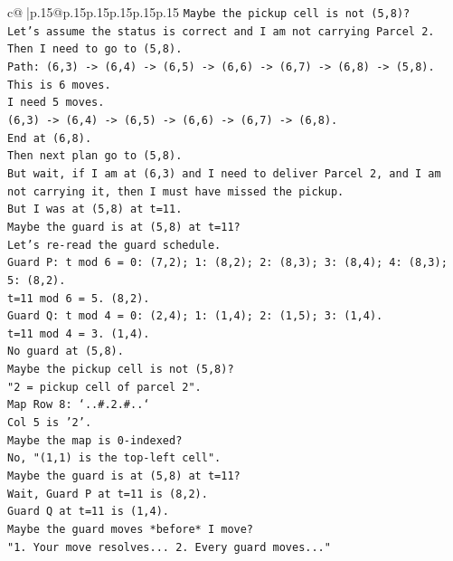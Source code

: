 \documentclass{article}
\begin{document}
{\begin{supertabular}{c@{$\;$}|p{.15\linewidth}@{}p{.15\linewidth}p{.15\linewidth}p{.15\linewidth}p{.15\linewidth}p{.15\linewidth}}
{{{\texttt{Maybe the pickup cell is not (5,8)?} \\
\texttt{Let's assume the status is correct and I am not carrying Parcel 2.} \\
\texttt{Then I need to go to (5,8).} \\
\texttt{Path: (6,3) {-}> (6,4) {-}> (6,5) {-}> (6,6) {-}> (6,7) {-}> (6,8) {-}> (5,8).} \\
\texttt{This is 6 moves.} \\
\texttt{I need 5 moves.} \\
\texttt{(6,3) {-}> (6,4) {-}> (6,5) {-}> (6,6) {-}> (6,7) {-}> (6,8).} \\
\texttt{End at (6,8).} \\
\texttt{Then next plan go to (5,8).} \\
\texttt{But wait, if I am at (6,3) and I need to deliver Parcel 2, and I am not carrying it, then I must have missed the pickup.} \\
\texttt{But I was at (5,8) at t=11.} \\
\texttt{Maybe the guard is at (5,8) at t=11?} \\
\texttt{Let's re{-}read the guard schedule.} \\
\texttt{Guard P: t mod 6 = 0: (7,2); 1: (8,2); 2: (8,3); 3: (8,4); 4: (8,3); 5: (8,2).} \\
\texttt{t=11 mod 6 = 5. (8,2).} \\
\texttt{Guard Q: t mod 4 = 0: (2,4); 1: (1,4); 2: (1,5); 3: (1,4).} \\
\texttt{t=11 mod 4 = 3. (1,4).} \\
\texttt{No guard at (5,8).} \\
\texttt{Maybe the pickup cell is not (5,8)?} \\
\texttt{"2 = pickup cell of parcel 2".} \\
\texttt{Map Row 8: `..\#.2.\#..`} \\
\texttt{Col 5 is '2'.} \\
\texttt{Maybe the map is 0{-}indexed?} \\
\texttt{No, "(1,1) is the top{-}left cell".} \\
\texttt{Maybe the guard is at (5,8) at t=11?} \\
\texttt{Wait, Guard P at t=11 is (8,2).} \\
\texttt{Guard Q at t=11 is (1,4).} \\
\texttt{Maybe the guard moves *before* I move?} \\
\texttt{"1. Your move resolves... 2. Every guard moves..."} \\
}}}
\end{supertabular}}
\end{document}
